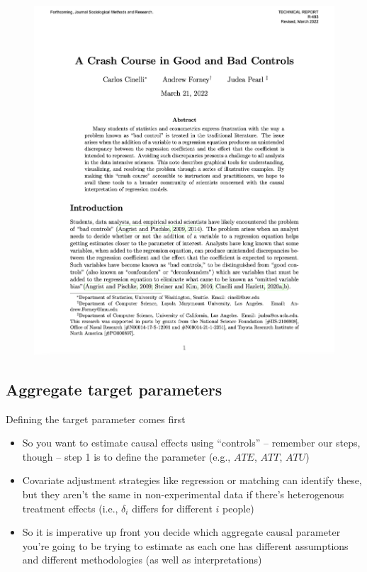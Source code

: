 \documentclass{beamer}
\begin{document}
\begin{frame}{}

  \begin{figure}
    \includegraphics[scale=0.25]{./lecture_includes/crash_course}
  \end{figure}

\end{frame}





\subsection{Aggregate target parameters}


\begin{frame}{Defining the target parameter comes first}

\begin{itemize}
\item So you want to estimate causal effects using ``controls'' -- remember our steps, though -- step 1 is to define the parameter (e.g., $ATE$, $ATT$, $ATU$)
\item Covariate adjustment strategies like regression or matching can identify these, but they aren't the same in non-experimental data if there's heterogenous treatment effects (i.e., $\delta_i$ differs for different $i$ people)
\item So it is imperative up front you decide which aggregate causal parameter you're going to be trying to estimate as each one has different assumptions and different methodologies (as well as interpretations)

\end{itemize}

\end{frame}
\end{document}
